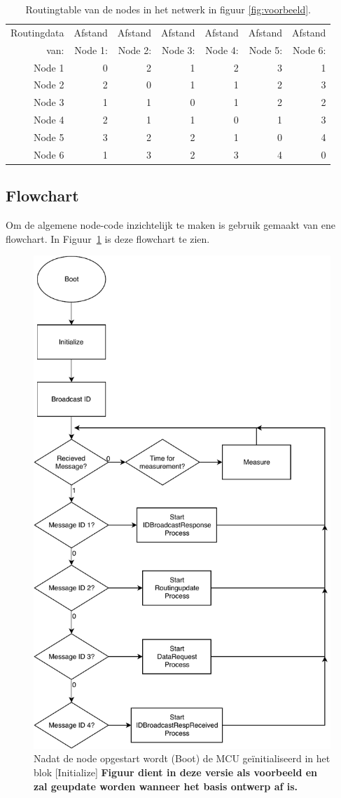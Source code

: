\documentclass[a4paper, 11pt]{article}
\begin{document}
\begin{table}
\centering
\begin{tabular}{|r||r|r|r|r|r|r|}
\hline
Routingdata  & Afstand  & Afstand & Afstand & Afstand & Afstand & Afstand\\
van: & Node 1: & Node 2: & Node 3: & Node 4: & Node 5: & Node 6: \\
\hline
Node 1 & 0 & 2 & 1 & 2 & 3 & 1 \\
\hline
Node 2 & 2 & 0 & 1 & 1 & 2 & 3 \\
\hline
Node 3 & 1 & 1 & 0 & 1 & 2 & 2 \\
\hline
Node 4 & 2 & 1 & 1 & 0 & 1 & 3 \\
\hline
Node 5 & 3 & 2 & 2 & 1 & 0 & 4 \\
\hline
Node 6 & 1 & 3 & 2 & 3 & 4 & 0 \\
\hline
\end{tabular}
\caption{Routingtable van de nodes in het netwerk in figuur \ref{fig:voorbeeld}.}
\label{table:routingtable}
\end{table}
\subsection{Flowchart}
Om de algemene node-code inzichtelijk te maken is gebruik gemaakt van ene flowchart. In Figuur~\ref{fig:flowchart} is deze flowchart te zien.

\begin{figure}[!h]
	\centering	
	\includegraphics[width=.5\textwidth, keepaspectratio]{media/Pflow.pdf}
    \caption{Nadat de node opgestart wordt (Boot) de MCU geïnitialiseerd in het blok [Initialize]
     \textbf{Figuur dient in deze versie als voorbeeld en zal geupdate worden wanneer het basis ontwerp af is.}}
    \label{fig:flowchart}
\end{figure}
\end{document}
